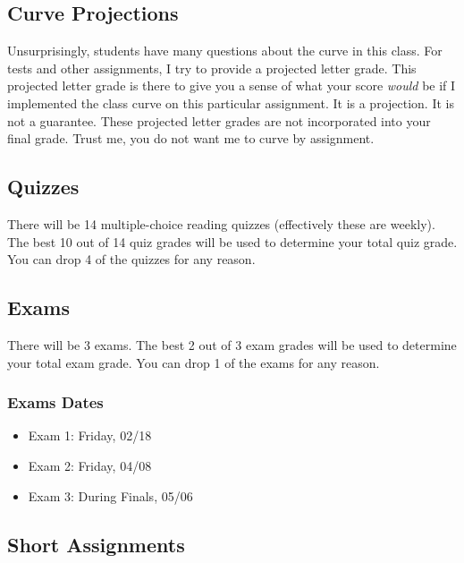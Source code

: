 \hypertarget{curve-projections-1}{%
\subsection*{Curve Projections}\label{curve-projections-1}}


Unsurprisingly, students have many questions about the curve in this class. For tests and other assignments, I try to provide a projected letter grade.
This projected letter grade is there to give you a sense of what your score \emph{would} be if I implemented the class curve on this particular assignment.
It is a projection. It is not a guarantee. These projected letter grades are not incorporated into your final grade.
Trust me, you do not want me to curve by assignment.

\hypertarget{quizzes-1}{%
\subsection*{Quizzes}\label{quizzes-1}}


There will be 14 multiple-choice reading quizzes (effectively these are weekly). The best 10 out of 14 quiz grades will be used to determine your total quiz grade. You can drop 4 of the quizzes for any reason.

\hypertarget{exams}{%
\subsection*{Exams}\label{exams}}


There will be 3 exams. The best 2 out of 3 exam grades will be used to determine your total exam grade. You can drop 1 of the exams for any reason.

\hypertarget{exams-dates}{%
\subsubsection*{Exams Dates}\label{exams-dates}}


\begin{itemize}
\item
  Exam 1: Friday, 02/18
\item
  Exam 2: Friday, 04/08
\item
  Exam 3: During Finals, 05/06
\end{itemize}

\hypertarget{short-assignments-1}{%
\subsection*{Short Assignments}\label{short-assignments-1}}


